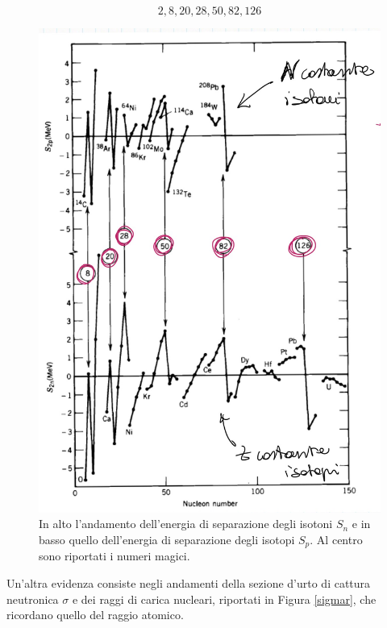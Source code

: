 $$2,8,20,28,50,82,126$$
\begin{figure}[!h]
    \centering
    \includegraphics[scale=0.3]{Immagini/mag-num.png}
    \caption{In alto l'andamento dell'energia di separazione degli isotoni $S_n$ e in basso quello dell'energia di separazione degli isotopi $S_p$. Al centro sono riportati i numeri magici.}
    \label{diffeng}
\end{figure}

\noindent Un'altra evidenza consiste negli andamenti della sezione d'urto di cattura neutronica $\sigma$ e dei raggi di carica nucleari, riportati in Figura \ref{sigmar}, che ricordano quello del raggio atomico.

